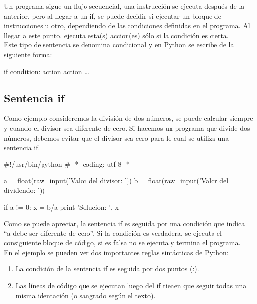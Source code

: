Un programa sigue un flujo secuencial, una instrucción se ejecuta después de la anterior, pero al llegar a un if, se puede decidir si ejecutar un bloque de instrucciones u otro, dependiendo de las condiciones definidas en el programa. Al llegar a este punto, ejecuta esta(s) accion(es) sólo si la condición es cierta.\\

Este tipo de sentencia se denomina condicional y en Python se escribe de la siguiente forma:\\

\begin{pyglist} [language=python]
if condition:
    action
    action
    ...
\end{pyglist}

\subsection{Sentencia if}

Como ejemplo consideremos la división de dos números, se puede calcular siempre y cuando el divisor sea diferente de cero. Si hacemos un programa que divide dos números, debemos evitar que el divisor sea cero para lo cual se utiliza una sentencia if.\\

\begin{pyglist} [language=python]
#!/usr/bin/python
# -*- coding: utf-8 -*-

a = float(raw_input('Valor del divisor: '))
b = float(raw_input('Valor del dividendo: '))

if a != 0:
    x = b/a
    print 'Solucion: ', x   
\end{pyglist}

Como se puede apreciar, la sentencia if es seguida por una condición que indica ``a debe ser diferente de cero''. Si la condición es verdadera, se ejecuta el consiguiente bloque de código, si es falsa no se ejecuta y termina el programa.\\

En el ejemplo se pueden ver dos importantes reglas sintácticas de Python:

\begin{enumerate}
\item La condición de la sentencia if es seguida por dos puntos (:).
\item Las líneas de código que se ejecutan luego del if tienen que seguir todas una misma identación (o sangrado según el texto). 
\end{enumerate}

